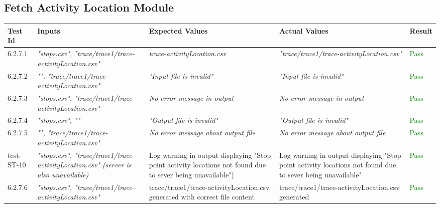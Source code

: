 \documentclass[12pt, titlepage]{article}
\begin{document}
\subsection{Fetch Activity Location Module}
\begin{tabular}{ | m{3.5em} | m{4cm}| m{4cm} | m{4cm} | m{1.2cm} | } 
  \hline
  \textbf{Test Id}& \textbf{Inputs} & \textbf{Expected Values} & \textbf{Actual Values} & \textbf{Result} \\ 
  \hline
  6.2.7.1 & \textit{"stops.csv", "trace/trace1/trace-activityLocation.csv"} & \textit{trace-activityLocation.csv} & \textit{"trace/trace1/trace-activityLocation.csv"} & \textcolor{green}{Pass} \\ 
  \hline
  6.2.7.2 & \textit{"", "trace/trace1/trace-activityLocation.csv"} & \textit{ "Input file is invalid"} & \textit{"Input file is invalid"} & \textcolor{green}{Pass} \\ 
  \hline
  6.2.7.3 & \textit{"stops.csv", "trace/trace1/trace-activityLocation.csv"} & \textit{No error message in output} & \textit{No error message in output} & \textcolor{green}{Pass} \\ 
  \hline 
  6.2.7.4 & \textit{"stops.csv", ""} & \textit{ "Output file is invalid"} & \textit{"Output file is invalid"} & \textcolor{green}{Pass} \\ 
  \hline
  6.2.7.5 & \textit{"", "trace/trace1/trace-activityLocation.csv"} & \textit{No error message about output file} & \textit{No error message about output file} & \textcolor{green}{Pass} \\ 
  \hline 
  test-ST-10 & \textit{"stops.csv", "trace/trace1/trace-activityLocation.csv" (server is also unavailable)} &  Log warning in output displaying "Stop point activity locations not found due to sever being unavailable") & Log warning in output displaying "Stop point activity locations not found due to sever being unavailable" & \textcolor{green}{Pass}\\ 
  \hline
  6.2.7.6 & \textit{"stops.csv", "trace/trace1/trace-activityLocation.csv"} & trace/trace1/trace-activityLocation.csv generated with correct file content & trace/trace1/trace-activityLocation.csv generated& \textcolor{green}{Pass} \\ \hline
\end{tabular}
\end{document}
